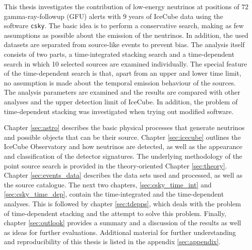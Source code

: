 This thesis investigates the contribution of low-energy neutrinos at positions of $\num{72}$ gamma-ray-followup (GFU) alerts with $\num{9}$ years of IceCube data using the software \texttt{csky}.
The basic idea is to perform a conservative search, making as few assumptions as possible about the emission of the neutrinos.
In addition, the used datasets are separated from source-like events to prevent bias.
The analysis itself consists of two parts, a time-integrated stacking search and a time-dependent search in which 10 selected sources are examined individually.
The special feature of the time-dependent search is that, apart from an upper and lower time limit, no assumption is made about the temporal emission behaviour of the sources.
The analysis parameters are examined and the results are compared with other analyses and the upper detection limit of IceCube.
In addition, the problem of time-dependent stacking was investigated when trying out modified software.

Chapter \ref{sec:astro} describes the basic physical processes that generate neutrinos and possible objects that can be their source.
Chapter \ref{sec:icecube} outlines the IceCube Observatory and how neutrinos are detected, as well as the appearance and classification of the detector signatures.
The underlying methodology of the point source search is provided in the theory-oriented Chapter \ref{sec:theory}.
Chapter \ref{sec:events_data} describes the data sets used and processed, as well as the source catalogue.
The next two chapters, \ref{sec:csky_time_int} and \ref{sec:csky_time_dep}, contain the time-integrated and the time-dependent analyses.
This is followed by chapter \ref{sec:tdepps}, which deals with the problem of time-dependent stacking and the attempt to solve this problem.
Finally, chapter \ref{sec:outlook} provides a summary and a discussion of the results as well as ideas for further evaluations.
Additional material for further understanding and reproducibility of this thesis is listed in the appendix \ref{sec:appendix}.
